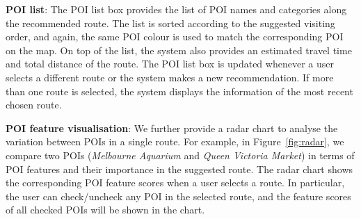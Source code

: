 
\textbf{POI list}:
The POI list box provides the list of POI names and categories along the recommended route.
The list is sorted according to the suggested visiting order, and again, the same POI colour is used to match the corresponding POI on the map.
On top of the list, the system also provides an estimated travel time and total distance of the route. 
The POI list box is updated whenever a user selects a different route or the system makes a new recommendation. %
If more than one route is selected, the system displays the information of the most recent chosen route.

\textbf{POI feature visualisation}: We further provide a radar chart to analyse the variation between POIs in a single route. 
For example, in Figure~\ref{fig:radar}, we compare two POIs (\textit{Melbourne Aquarium} and \textit{Queen Victoria Market}) in terms of POI features and their importance in the suggested route. 
The radar chart shows the corresponding POI feature scores when a user selects a route.
In particular, the user can check/uncheck any POI in the selected route, and the feature scores of all checked POIs will be shown in the chart.

